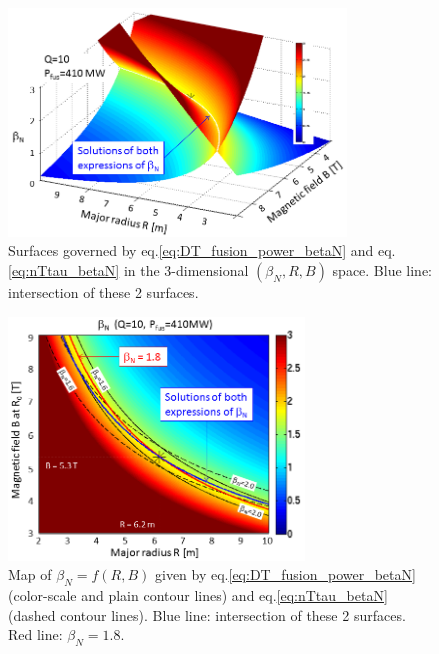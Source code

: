\begin{figure} 
	\begin{center}
		\includegraphics[width=0.8\textwidth]{figures/Fig_3D_betaN_R_B_ITER_v2.png}
		\caption{Surfaces governed by eq.\ref{eq:DT_fusion_power_betaN} and eq.\ref{eq:nTtau_betaN} in the 
			3-dimensional $(\beta_N,R,B)$ space. Blue line: intersection of these 2 surfaces.}
		\label{fig:R_B_betaN_3D}
	\end{center}
\end{figure}

\begin{figure} 
	\begin{center}
		\includegraphics[width=0.7\textwidth]{figures/Fig_2D_betaN_R_B_ITER_v2.png}%
		\caption{Map of $\beta_N=f(R,B)$ given by eq.\ref{eq:DT_fusion_power_betaN} (color-scale and plain contour lines) and eq.\ref{eq:nTtau_betaN} (dashed contour lines). Blue line: intersection of these 2 surfaces. Red line: $\beta_N = 1.8$.}
		\label{fig:R_B_betaN_2D}
	\end{center}
\end{figure}

